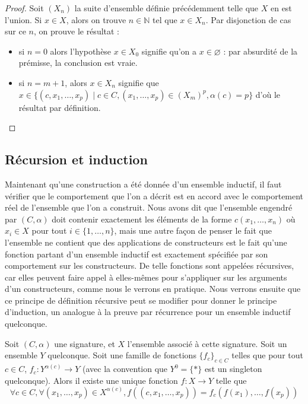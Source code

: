 \begin{proof}
  Soit $(X_n)$ la suite d'ensemble définie précédemment telle que $X$ en est
  l'union. Si $x\in X$, alors on trouve $n \in \mathbb N$ tel que $x\in X_n$.
  Par disjonction de cas sur ce $n$, on prouve le résultat :
  \begin{itemize}
  \item si $n = 0$ alors l'hypothèse $x \in X_0$ signifie qu'on a
    $x\in \varnothing$ : par absurdité de la prémisse, la conclusion est vraie.
  \item si $n = m+1$, alors $x\in X_n$ signifie que
    $x \in \{(c,x_1,\ldots,x_p)\mid c\in C, (x_1,\ldots,x_p)\in(X_m)^p,
    \alpha(c) = p\}$ d'où le résultat par définition.
  \end{itemize}
\end{proof}

\subsection{Récursion et induction}

Maintenant qu'une construction a été donnée d'un ensemble inductif, il faut
vérifier que le comportement que l'on a décrit est en accord avec le
comportement réel de l'ensemble que l'on a construit. Nous avons dit que
l'ensemble engendré par $(C,\alpha)$ doit contenir exactement les éléments de
la forme $c(x_1,\ldots,x_n)$ où $x_i \in X$ pour tout $i\in\{1,\ldots,n\}$, mais
une autre façon de penser le fait que l'ensemble ne contient que des
applications de constructeurs est le fait qu'une fonction partant d'un ensemble
inductif est exactement spécifiée par son comportement sur les constructeurs.
De telle fonctions sont appelées récursives, car elles peuvent faire appel à
elles-mêmes pour s'appliquer sur les arguments d'un constructeurs, comme nous le
verrons en pratique. Nous verrons ensuite que ce principe de définition
récursive peut se modifier pour donner le principe d'induction, un analogue à
la preuve par récurrence pour un ensemble inductif quelconque.

\begin{theorem}
  Soit $(C,\alpha)$ une signature, et $X$ l'ensemble associé à cette signature.
  Soit un ensemble $Y$ quelconque.
  Soit une famille de fonctions $\{f_c\}_{c\in C}$ telles que pour tout $c\in C$,
  $f_c : Y^{\alpha(c)} \to Y$ (avec la convention que $Y^0 = \{*\}$ est un
  singleton quelconque). Alors il existe une unique fonction $f : X \to Y$
  telle que
  $$\forall c\in C, \forall (x_1,\ldots,x_p)\in X^{\alpha(c)},
  f((c,x_1,\ldots,x_p)) = f_c (f(x_1),\ldots,f(x_p))$$
\end{theorem}

